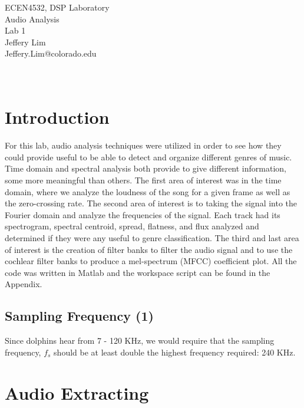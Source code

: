 \documentclass[11pt, a4paper]{article}
\begin{document}
\begin{center}
  \Huge ECEN4532, DSP Laboratory \\
  \huge Audio Analysis \\
  \huge Lab 1\\
  
  \vspace{7in}
    \huge Jeffery Lim \\
    \huge Jeffery.Lim@colorado.edu\\~\\~\\
\end{center}
\pagebreak


\tableofcontents

\pagebreak

\section{Introduction}

For this lab, audio analysis techniques were utilized in order to see how they could provide useful to be able to detect and organize different genres of music. Time domain and spectral analysis both provide to give different information, some more meaningful than others. The first area of interest was in the time domain, where we analyze the loudness of the song for a given frame as well as the zero-crossing rate. The second area of interest is to taking the signal into the Fourier domain and analyze the frequencies of the signal. Each track had its spectrogram, spectral centroid, spread, flatness, and flux analyzed and determined if they were any useful to genre classification. The third and last area of interest is the creation of filter banks to filter the audio signal and to use the cochlear filter banks to produce a mel-spectrum (MFCC) coefficient plot. All the code was written in Matlab and the workspace script can be found in the Appendix.

\subsection{Sampling Frequency (1)}

Since dolphins hear from 7 - 120 KHz, we would require that the sampling frequency, $f_s$ should be at least double the highest frequency required: 240 KHz.

\section{Audio Extracting}
\end{document}
